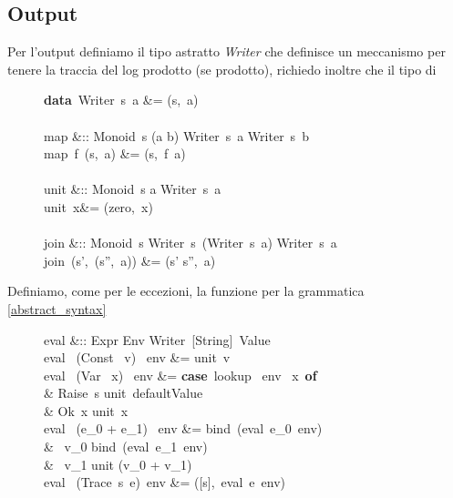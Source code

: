 \subsection{Output}
\label{output}

Per l'output definiamo il tipo astratto \textit{Writer} che definisce un
meccanismo per tenere la traccia del log prodotto (se prodotto), richiedo
inoltre che il tipo di

\begin{figure}[H]
  \centering
  \footnotesize %
  \begin{haskellsyntax}
    \textbf{data}\ Writer\ s\ a &= (s,\ a) \\\\

      map &:: Monoid\ s \Rightarrow (a \to b) \to Writer\ s\ a \to Writer\ s\ b\\
      map\ f\ (s,\ a) &= (s,\ f\ a)\\\\

      unit &:: Monoid\ s \Rightarrow a \to Writer\ s\ a\\
      unit\ x&= (zero,\ x)\\\\

      join &:: Monoid\ s \Rightarrow Writer\ s\ (Writer\ s\ a) \to Writer\ s\ a\\
      join\ (s',\ (s'',\ a)) &= (s' \doubleplus s'',\ a)
  \end{haskellsyntax}%
\end{figure}

Definiamo, come per le eccezioni, la funzione per la grammatica
\ref{abstract_syntax}

\begin{figure}[H]
  \centering
  \footnotesize %
  \begin{haskellsyntax}
  eval &:: Expr \to Env \to Writer\ [String]\ Value\\
  eval \ (Const \ v) \ env &= unit\ v\\
  eval \ (Var \ x) \ env   &= \textbf{case}\ lookup \ env \ x\ \textbf{of}\\
                           & \qquad Raise\ s \to unit\ defaultValue\\
                           & \qquad Ok\ x \to unit\ x\\
  eval \ (e_0 + e_1) \ env &= bind\ (eval\ e_0\ env)\\
                           & \qquad \lambda\ v_0 \to bind\ (eval\ e_1\ env)\\
                           & \qquad \qquad \lambda\ v_1 \to unit (v_0 + v_1)\\
  eval \ (Trace\ s\ e)\ env  &= ([s],\ eval\ e\ env)
  \end{haskellsyntax}%
\end{figure}

